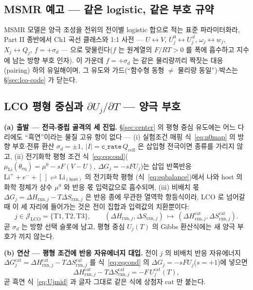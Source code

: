 \documentclass[11pt,a4paper]{article}
\newcommand{\eq}{\mathrm{eq}}
\newcommand{\cell}{\mathrm{cell}}
\newcommand{\rxn}{\mathrm{rxn}}
\newcommand{\code}[1]{\texttt{#1}}
\begin{document}
\subsection{MSMR 예고 --- 같은 logistic, 같은 부호 규약}\label{sec:lco-preview}
MSMR 모델은 양극 조성을 전위의 전이별 logistic 합으로 적는 표준
파라미터화라, Part II 종반에서 Ch1 곡선 클래스와 1:1 사전 --- $U\leftrightarrow V$,
$U_j^0\leftrightarrow U_j^{\,d}$, $\omega_j\leftrightarrow w_j$, $X_j\leftrightarrow Q_j$, $f=+\sigma_d$ ---
으로 맞물린다($f$ 는 원계열의 $F/RT>0$ 를 폭에 흡수하고 지수에 남는 방향 부호 인자). 이 가운데
$f=+\sigma_d$ 는 같은 물리량끼리 짝짓는 대응(pairing) 하의 유일해이며, 그 유도와 가드(``함수형 동형 $\ne$ 물리량
동일'')$\cdot$박스는 \S\ref{sec:lco-code} 가 닫는다.

\subsection{LCO 평형 중심과 $\partial U_j/\partial T$ — 양극 부호}\label{sec:lco-center}
\textbf{(a) 출발 — 전극-중립 골격의 세 진입.}
\S\ref{sec:center} 의 평형 중심 유도에는 어느 다리에도 ``흑연''이라는 물질 고유 항이 없다 —
(i) 실험조건 매핑 식~\eqref{eq:n0map} 의 방향 부호$\cdot$전류 환산
$\sigma_d=\pm1,\ |I|=\code{c\_rate}\,Q_\cell$ 은 삽입형 전극이면 종류를 가리지 않고, (ii) 전기화학 평형
조건 식~\eqref{eq:eqcond}($\mu_\mathrm{Li}(\theta_\eq)=\mu^0-sF(V-U),\ \Delta G_j=-sFU_j$)는 삽입
반쪽반응 $\mathrm{Li}^++e^-+[\,]\rightleftharpoons\mathrm{Li}_{(\text{host})}$ 의 전기화학 평형
(식~\eqref{eq:eqbalance})에서 나와 host 의 화학 정체가 상수 $\mu^0$ 와 반응 몫 입력값으로 흡수되며,
(iii) 비배치 몫 $\Delta G_j=\Delta H_{\rxn,j}-T\Delta S_{\rxn,j}$ 은 반응 종에 무관한 열역학 항등식이라,
LCO 로 넘어갈 때 이 세 자리에 들어가는 것은 전이 집합과 입력값의 치환뿐이다:
\begin{equation}
j\in\mathcal J_\mathrm{LCO}=\{\mathrm{T1},\mathrm{T2},\mathrm{T3}\},\qquad
(\Delta H_{\rxn,j},\Delta S_{\rxn,j})\ \longmapsto\
(\Delta H_{\rxn,j}^\mathrm{cat},\Delta S_{\rxn,j}^\mathrm{cat}).
\label{eq:lco-n0sub}
\end{equation}
곧 $\sigma_d$ 는 방향 선택 슬롯에 남고, 평형 중심 $U_j(T)$ 의 Gibbs 환산식에는 새 양극 부호가 끼지 않는다.

\textbf{(b) 연산 — 평형 조건에 반응 자유에너지 대입.}
전이 $j$ 의 비배치 반응 자유에너지 $\Delta G_j^\mathrm{cat}=\Delta H_{\rxn,j}^\mathrm{cat}
-T\Delta S_{\rxn,j}^\mathrm{cat}$ 를 식~\eqref{eq:eqcond} 의 $\Delta G_j=-sFU_j$($s=+1$)에 넣으면
\[
\Delta H_{\rxn,j}^\mathrm{cat}-T\Delta S_{\rxn,j}^\mathrm{cat}=-F\,U_j^\mathrm{cat}(T),
\]
곧 흑연 식~\eqref{eq:Ujmid} 과 글자 그대로 같은 식에 상첨자 $\mathrm{cat}$ 만 붙는다.
\end{document}
